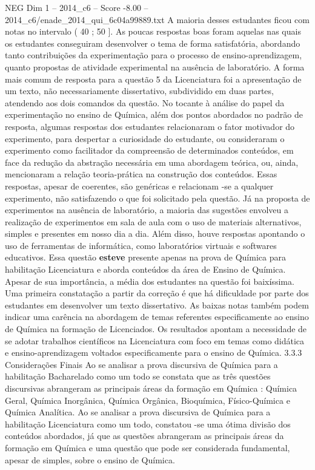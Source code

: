 \begin{textsample}{NEG Dim 1 – 2014\_c6 – Score -8.00 – 2014\_c6/enade\_2014\_qui\_6c04a99889.txt}
A maioria desses estudantes ficou com notas no intervalo ( 40 ; 50 ].
As poucas respostas boas foram aquelas nas quais os estudantes conseguiram desenvolver o tema de forma satisfatória, abordando tanto contribuições da experimentação para o processo de ensino-aprendizagem, quanto propostas de atividade experimental na ausência de laboratório.
A forma mais comum de resposta para a questão 5 da Licenciatura foi a apresentação de um texto, não necessariamente dissertativo, subdividido em duas partes, atendendo aos dois comandos da questão.
No tocante à análise do papel da experimentação no ensino de Química, além dos pontos abordados no padrão de resposta, algumas respostas dos estudantes relacionaram o fator motivador do experimento, para despertar a curiosidade do estudante, ou consideraram o experimento como facilitador da compreensão de determinados conteúdos, em face da redução da abstração necessária em uma abordagem teórica, ou, ainda, mencionaram a relação teoria-prática na construção dos conteúdos.
Essas respostas, apesar de coerentes, são genéricas e relacionam -se a qualquer experimento, não satisfazendo o que foi solicitado pela questão.
Já na proposta de experimentos na ausência de laboratório, a maioria das sugestões envolveu a realização de experimentos em sala de aula com o uso de materiais alternativos, simples e presentes em nosso dia a dia.
Além disso, houve respostas apontando o uso de ferramentas de informática, como laboratórios virtuais e softwares educativos.
Essa questão \textbf{esteve} presente apenas na prova de Química para habilitação Licenciatura e aborda conteúdos da área de Ensino de Química.
Apesar de sua importância, a média dos estudantes na questão foi baixíssima.
Uma primeira constatação a partir da correção é que há dificuldade por parte dos estudantes em desenvolver um texto dissertativo.
As baixas notas também podem indicar uma carência na abordagem de temas referentes especificamente ao ensino de Química na formação de Licenciados.
Os resultados apontam a necessidade de se adotar trabalhos científicos na Licenciatura com foco em temas como didática e ensino-aprendizagem voltados especificamente para o ensino de Química. 3.3.3 Considerações Finais Ao se analisar a prova discursiva de Química para a habilitação Bacharelado como um todo se constata que as três questões discursivas abrangeram as principais áreas da formação em Química : Química Geral, Química Inorgânica, Química Orgânica, Bioquímica, Físico-Química e Química Analítica.
Ao se analisar a prova discursiva de Química para a habilitação Licenciatura como um todo, constatou -se uma ótima divisão dos conteúdos abordados, já que as questões abrangeram as principais áreas da formação em Química e uma questão que pode ser considerada fundamental, apesar de simples, sobre o ensino de Química.

\end{textsample}
